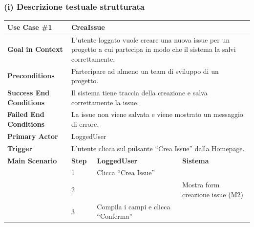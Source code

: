 \documentclass[a4paper,12pt]{article}
\begin{document}
\subsubsection*{(i) Descrizione testuale strutturata}
{}

\begin{tcolorbox}[
    enhanced,
    colback=white,
    colframe=UninaBlue,
    boxrule=0.8pt,
    arc=3pt,
    sharp corners,
    title=Use Case \#1: Crea Issue,
    fonttitle=\bfseries\color{UninaBlue},
    coltitle=UninaBlue,
    breakable
]
\small
\renewcommand{\arraystretch}{1.4}
\setlength{\tabcolsep}{6pt}
\begin{longtable}{|p{2.8cm}|p{2cm}|p{4cm}|p{4cm}|}
  \hline
  \textbf{Use Case \#1} & \multicolumn{3}{l|}{\textbf{CreaIssue}} \\ 
  \hline
  \textbf{Goal in Context} & \multicolumn{3}{p{10cm}|}{L'utente loggato vuole creare una nuova issue per un progetto a cui partecipa in modo che il sistema la salvi correttamente.} \\
  \hline
  \textbf{Preconditions} & \multicolumn{3}{p{10cm}|}{Partecipare ad almeno un team di sviluppo di un progetto.} \\
  \hline
  \textbf{Success End Conditions} & \multicolumn{3}{p{10cm}|}{Il sistema tiene traccia della creazione e salva correttamente la issue.} \\
  \hline
  \textbf{Failed End Conditions} & \multicolumn{3}{p{10cm}|}{La issue non viene salvata e viene mostrato un messaggio di errore.} \\
  \hline
  \textbf{Primary Actor} & \multicolumn{3}{l|}{LoggedUser} \\
  \hline
  \textbf{Trigger} & \multicolumn{3}{l|}{L'utente clicca sul pulsante ``Crea Issue'' dalla Homepage.} \\
  \hline
  \textbf{Main Scenario} & \textbf{Step} & \textbf{LoggedUser} & \textbf{Sistema} \\
  \hline
  & 1  & Clicca ``Crea Issue'' & \multicolumn{1}{c|}{\vphantom{X}\raisebox{0.25ex}{\hbox{\ding{55}}}} \\
  \cline{2-4}
  & 2  & \multicolumn{1}{c|}{\vphantom{X}\raisebox{0.25ex}{\hbox{\ding{55}}}} & Mostra form creazione issue (M2) \\
  \cline{2-4}
  & 3  & Compila i campi e clicca ``Conferma'' & \multicolumn{1}{c|}{\vphantom{X}\raisebox{0.25ex}{\hbox{\ding{55}}}} \\

\end{longtable}
\end{tcolorbox}
\end{document}
